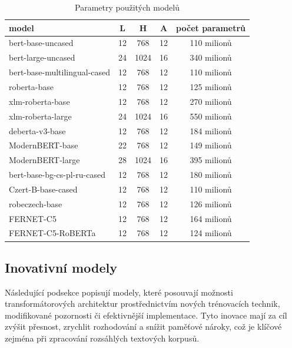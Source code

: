 \begin{table}[ht]
    \centering
    \begin{tabular}{|l|c|c|c|c|}
        \hline
        \textbf{model} & \textbf{L} & \textbf{H} & \textbf{A} & \textbf{počet parametrů}  \\ \hline
        bert-base-uncased & 12 & 768 & 12 & 110 milionů \\ \hline
        bert-large-uncased & 24 & 1024 & 16 & 340 milionů \\ \hline
        bert-base-multilingual-cased & 12 & 768 & 12 & 110 milionů \\ \hline
        roberta-base & 12 & 768 & 12 & 125 milionů \\ \hline
        xlm-roberta-base & 12 & 768 & 12 & 270 milionů \\ \hline
        xlm-roberta-large & 24 & 1024 & 16 & 550 milionů \\ \hline
        deberta-v3-base & 12 & 768 & 12 & 184 milionů \\ \hline
        ModernBERT-base & 22 & 768 & 12 & 149 milionů \\ \hline
        ModernBERT-large & 28 & 1024 & 16 & 395 milionů \\ \hline\hline
        bert-base-bg-cs-pl-ru-cased & 12 & 768 & 12 & 180 milionů \\ \hline 
        Czert-B-base-cased & 12 & 768 & 12 & 110 milionů \\ \hline
        robeczech-base & 12 & 768 & 12 & 126 milionů \\ \hline
        FERNET-C5 & 12 & 768 & 12 & 164 milionů \\ \hline
        FERNET-C5-RoBERTa & 12 & 768 & 12 & 124 milionů \\
        \hline
    \end{tabular}
    \caption{Parametry použitých modelů}
    \label{tab:modely}
\end{table}

\subsection{Inovativní modely}
Následující podsekce popisují modely, které posouvají možnosti transformátorových architektur prostřednictvím nových trénovacích technik, modifikované pozornosti či efektivnější implementace. Tyto inovace mají za cíl zvýšit přesnost, zrychlit rozhodování a snížit paměťové nároky, což je klíčové zejména při zpracování rozsáhlých textových korpusů.

